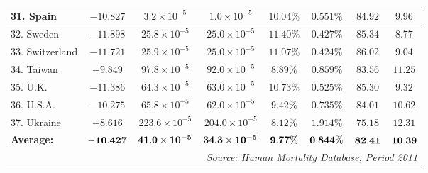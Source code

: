 \documentclass[12pt, titlepage]{article}%
\begin{document}
\begin{table}
\begin{center}
\begin{tabular}{||l|c|c|c|c|c|c|c||}
31. Spain &  $-10.827$ & $3.2\times10^{-5}$ & $1.0\times10^{-5}$ & $10.04\%$ & $0.551\%$ & $84.92$ & $9.96$\\ \hline
32. Sweden &  $-11.898$ & $25.8\times10^{-5}$ & $25.0\times10^{-5}$ & $11.40\%$ & $0.427\%$ & $85.34$ & $8.77$\\ \hline
33. Switzerland &  $-11.721$ & $25.9\times10^{-5}$ & $25.0\times10^{-5}$ & $11.07\%$ & $0.424\%$ & $86.02$ & $9.04$\\ \hline
34. Taiwan &  $-9.849$ & $97.8\times10^{-5}$ & $92.0\times10^{-5}$ & $8.89\%$ & $0.859\%$ & $83.56$ & $11.25$\\ \hline
35. U.K. &  $-11.386$ & $64.3\times10^{-5}$ & $63.0\times10^{-5}$ & $10.73\%$ & $0.525\%$ & $85.30$ & $9.32$\\ \hline
36. U.S.A. &  $-10.275$ & $65.8\times10^{-5}$ & $62.0\times10^{-5}$ & $9.42\%$ & $0.735\%$ & $84.01$ & $10.62$\\ \hline
37. Ukraine &  $-8.616$ & $223.6\times10^{-5}$ & $204.0\times10^{-5}$ & $8.12\%$ & $1.914\%$ & $75.18$ & $12.31$\\ \hline
{\bf Average:} & $\bf -10.427$ & $\bf 41.0\times10^{-5}$ & $\bf 34.3\times10^{-5}$ & $\bf 9.77\%$ & $\bf 0.844\%$ & $\bf 82.41$ & $\bf 10.39$\\ \hline
\hline
\multicolumn{8}{||r||}{{\em Source: Human Mortality Database, Period 2011}} \\ \hline\hline
\end{tabular}
\label{lab1}
\smallskip
\end{center}
\end{table}
\end{document}
